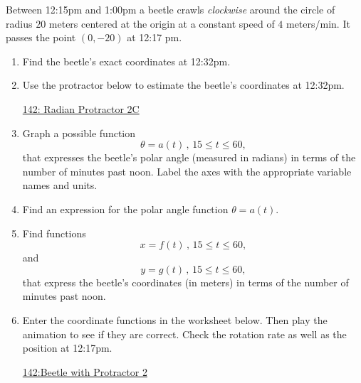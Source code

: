 \documentclass{ximera}
\begin{document}
\begin{question}  \label{Q9hhhhhhg94tf4}

Between 12:15pm and 1:00pm a beetle crawls \emph{clockwise} around the circle of radius $20$ meters centered at the origin at a constant speed of $4$ meters/min. It passes the point $(0,-20)$ at 12:17 pm.

\begin{enumerate}

\item Find the beetle's exact coordinates at 12:32pm.

\item Use the protractor below to estimate the beetle's coordinates at 12:32pm. 

\begin{onlineOnly}
    \begin{center}
\end{center}
\end{onlineOnly}

\href{https://www.desmos.com/calculator/lbkveixdno}{142: Radian Protractor 2C}


\item Graph a possible function
\[
 \theta = a(t) \, , \, 15\leq t \leq 60 ,
\]
that expresses the beetle's polar angle (measured in radians) in terms of the number of minutes past noon. Label the axes with the appropriate variable names and units.

\item Find an expression for the polar angle function $\theta = a(t)$.

\item Find functions
\[
     x = f(t) \, , \, 15 \leq t \leq 60,
\]
and
\[
     y = g(t) \, , \, 15 \leq t \leq 60,
\]
that express the beetle's coordinates (in meters) in terms of the number of minutes past noon.

\item Enter the coordinate functions in the worksheet below. Then play the animation to see if they are correct. Check the rotation rate as well as the position at 12:17pm.

\begin{onlineOnly}
    \begin{center}
\end{center}
\end{onlineOnly}

\href{https://www.desmos.com/calculator/u2c21q9zj4}{142:Beetle with Protractor 2}
\end{enumerate}

\end{question}
\end{document}
